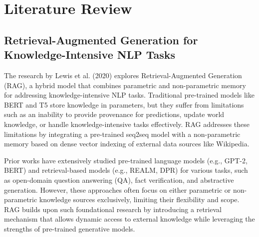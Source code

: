 \chapter{Literature Review}
\label{C2} %


\space
\clearpage



\section*{Retrieval-Augmented Generation for Knowledge-Intensive NLP Tasks}

The research by Lewis et al. (2020) explores Retrieval-Augmented Generation (RAG), a hybrid model that combines parametric and non-parametric memory for addressing knowledge-intensive NLP tasks. Traditional pre-trained models like BERT and T5 store knowledge in parameters, but they suffer from limitations such as an inability to provide provenance for predictions, update world knowledge, or handle knowledge-intensive tasks effectively. RAG addresses these limitations by integrating a pre-trained seq2seq model with a non-parametric memory based on dense vector indexing of external data sources like Wikipedia.

Prior works have extensively studied pre-trained language models (e.g., GPT-2, BERT) and retrieval-based models (e.g., REALM, DPR) for various tasks, such as open-domain question answering (QA), fact verification, and abstractive generation. However, these approaches often focus on either parametric or non-parametric knowledge sources exclusively, limiting their flexibility and scope. RAG builds upon such foundational research by introducing a retrieval mechanism that allows dynamic access to external knowledge while leveraging the strengths of pre-trained generative models.

